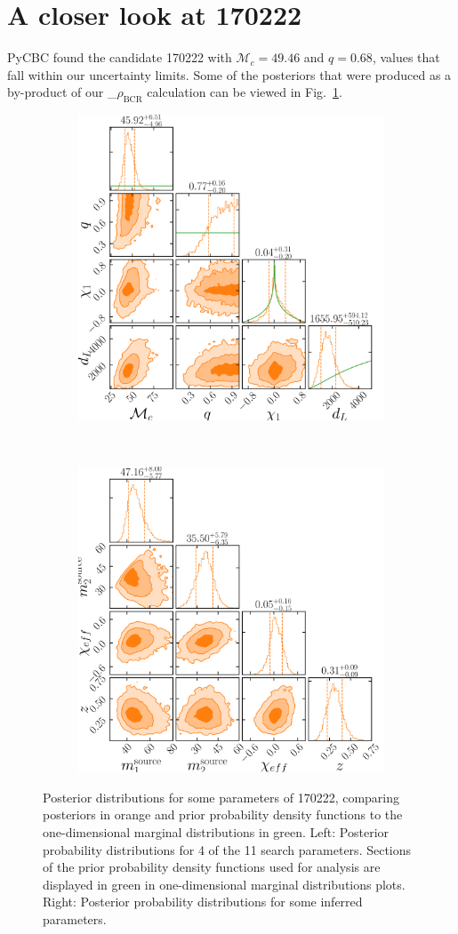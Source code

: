 \documentclass[%
 nofootinbib,
 amsmath,amssymb,
 aps,
 twocolumn,
 superscriptaddress
]{revtex4-2}
\newcommand{\mathcmd}[1]{{\sc \relax\ifmmode#1\else $#1$\fi}\xspace}
\newcommand{\bcr}{\mathcmd{\rho_\text{BCR}}}
\begin{document}



\section{A closer look at 170222}\label{apdx:170222}
PyCBC found the candidate 170222 with $\mathcal{M}_c=49.46$ and $q=0.68$, values that fall within our uncertainty limits. Some of the posteriors that were produced as a by-product of our \bcr calculation can be viewed in Fig.~\ref{fig:170222}.

\begin{figure}
    \centering
    \begin{subfigure}
        \centering
        \includegraphics[width=0.45\linewidth]{170222_prior_posterior.png}
    \end{subfigure}
    ~ 
    \begin{subfigure}
        \centering
        \includegraphics[width=0.45\linewidth]{170222_source_posterior.png}
    \end{subfigure}
    \caption{Posterior distributions for some parameters of 170222, comparing posteriors in orange and prior probability density functions to the one-dimensional marginal distributions in green. 
    Left: Posterior probability distributions for 4 of the 11 search parameters. Sections of the prior probability density functions used for analysis are displayed in green in one-dimensional marginal distributions plots.
    Right: Posterior probability distributions for some inferred parameters.
    \label{fig:170222}}
\end{figure}
\end{document}
